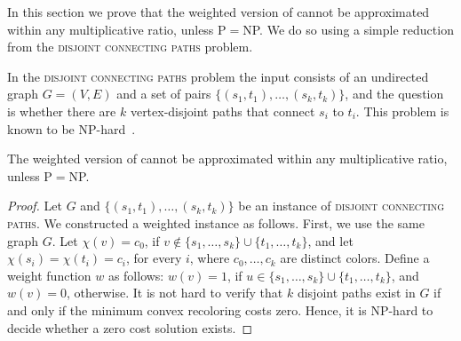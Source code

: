 \label{sec:hard}

In this section we prove that the weighted version of \TWOCR{} cannot
be approximated within any multiplicative ratio, unless P$=$NP.  We
do so using a simple reduction from the 
\textsc{disjoint connecting paths} problem.

In the \textsc{disjoint connecting paths} problem the input consists
of an undirected graph $G=(V,E)$ and a set of pairs $\{(s_1,
t_1), \ldots, (s_k, t_k)\}$, and the question is whether there are $k$
vertex-disjoint paths that connect $s_i$ to $t_i$.  This problem is
known to be NP-hard~\cite{karp1972reducibility}.

\begin{theorem}
The weighted version of \TWOCR{} cannot be approximated within any
 multiplicative ratio, unless P$=$NP.
\end{theorem}
\begin{proof}
Let $G$ and $\{(s_1, t_1), \ldots, (s_k, t_k)\}$ be an instance
of \textsc{disjoint connecting paths}.  We constructed a
weighted \TWOCR{} instance as follows.  First, we use the same graph
$G$.  Let $\chi(v) = c_0$, if
$v \not\in \{s_1,\ldots,s_k\} \cup \{t_1,\ldots,t_k\}$, and let
$\chi(s_i) = \chi(t_i) = c_i$, for every $i$, where $c_0, \ldots, c_k$
are distinct colors.
%
Define a weight function $w$ as follows: $w(v) = 1$, if
$u \in \{s_1,\ldots,s_k\} \cup \{t_1,\ldots,t_k\}$, and $w(v) = 0$,
otherwise.
%
It is not hard to verify that $k$ disjoint paths exist in $G$ if and
only if the minimum convex recoloring costs zero.  Hence, it is
NP-hard to decide whether a zero cost solution exists.

\end{proof}
